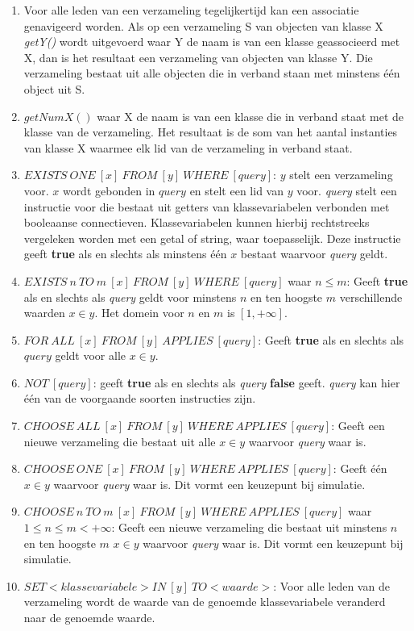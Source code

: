 \begin{enumerate}
	\item Voor alle leden van een verzameling tegelijkertijd kan een associatie genavigeerd worden. Als op een verzameling S van objecten van klasse X \textit{getY()} wordt uitgevoerd waar Y de naam is van een klasse geassocieerd met X, dan is het resultaat een verzameling van objecten van klasse Y. Die verzameling bestaat uit alle objecten die in verband staan met minstens \'e\'en object uit S.
	\item $getNumX()$ waar X de naam is van een klasse die in verband staat met de klasse van de verzameling. Het resultaat is de som van het aantal instanties van klasse X waarmee elk lid van de verzameling in verband staat.
	\item $EXISTS\ ONE\ [x]\ FROM\ [y]\ WHERE\ [query]$: $y$ stelt een verzameling voor. $x$ wordt gebonden in $query$ en stelt een lid van $y$ voor. \textit{query} stelt een instructie voor die bestaat uit getters van klassevariabelen verbonden met booleaanse connectieven. Klassevariabelen kunnen hierbij rechtstreeks vergeleken worden met een getal of string, waar toepasselijk. Deze instructie geeft \textbf{true} als en slechts als minstens \'e\'en $x$ bestaat waarvoor \textit{query} geldt.\label{instr:exists-one}
	\item $EXISTS\ n\ TO\ m\ [x]\ FROM\ [y]\  WHERE\ [query]$ waar $n \leq m$: Geeft \textbf{true} als en slechts als \textit{query} geldt voor minstens $n$ en ten hoogste $m$ verschillende waarden $x \in y$. Het domein voor $n$ en $m$ is $[1,+\infty]$.
	\item $FOR\ ALL\ [x]\ FROM\ [y]\ APPLIES\ [query]$: Geeft \textbf{true} als en slechts als $query$ geldt voor alle $x \in y$.
	\item $NOT\ [query]$: geeft \textbf{true} als en slechts als \textit{query} \textbf{false} geeft. \textit{query} kan hier \'e\'en van de voorgaande soorten instructies zijn.
	\item $CHOOSE\ ALL\ [x]\ FROM\ [y]\ WHERE\ APPLIES\ [query]$: Geeft een nieuwe verzameling die bestaat uit alle $x \in y$ waarvoor \textit{query} waar is.
	\item $CHOOSE\ ONE\ [x]\ FROM\ [y]\ WHERE\ APPLIES\ [query]$: Geeft \'e\'en $x \in y$ waarvoor \textit{query} waar is. Dit vormt een keuzepunt bij simulatie.\label{instr:choose-one}
	\item $CHOOSE\ n\ TO\ m\ [x]\ FROM\ [y]\ WHERE\ APPLIES\ [query]$ waar $1 \leq n \leq m < +\infty$: Geeft een nieuwe verzameling die bestaat uit minstens $n$ en ten hoogste $m$ $x \in y$ waarvoor \textit{query} waar is. Dit vormt een keuzepunt bij simulatie.\label{instr:choose-n-to-m}
	\item $SET <klassevariabele> IN\ [y]\ TO <waarde>$: Voor alle leden van de verzameling wordt de waarde van de genoemde klassevariabele veranderd naar de genoemde waarde.\label{instr:set}
\end{enumerate}

